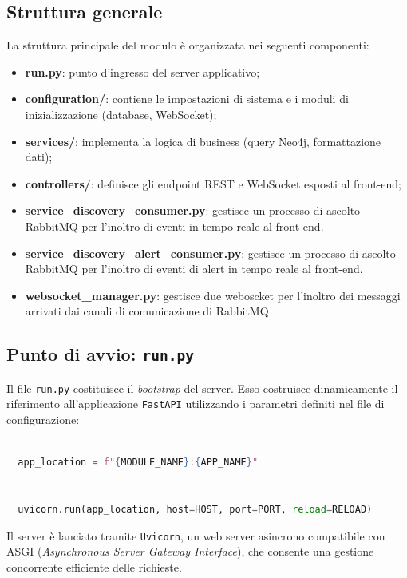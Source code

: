 \subsection{Struttura generale}
La struttura principale del modulo è organizzata nei seguenti componenti:
\begin{itemize}
  \item \textbf{run.py}: punto d’ingresso del server applicativo;
  \item \textbf{configuration/}: contiene le impostazioni di sistema e i moduli di inizializzazione (database, WebSocket);
  \item \textbf{services/}: implementa la logica di business (query Neo4j, formattazione dati);
  \item \textbf{controllers/}: definisce gli endpoint REST e WebSocket esposti al front-end;
  \item \textbf{service\_discovery\_consumer.py}: gestisce un processo di ascolto RabbitMQ per l’inoltro di eventi in tempo reale al front-end.
  \item \textbf{service\_discovery\_alert\_consumer.py}: gestisce un processo di ascolto RabbitMQ per l'inoltro di eventi di alert in tempo reale al front-end. 
  \item \textbf{websocket\_manager.py}: gestisce due weboscket per l'inoltro dei messaggi arrivati dai canali di comunicazione di RabbitMQ 
\end{itemize}

\subsection{Punto di avvio: \texttt{run.py}}
Il file \texttt{run.py} costituisce il \textit{bootstrap} del server.  
Esso costruisce dinamicamente il riferimento all’applicazione \texttt{FastAPI} utilizzando i parametri definiti nel file di configurazione:

\begin{lstlisting}[language=Python, caption={Setting up iniziale del server fastapi}]

  app_location = f"{MODULE_NAME}:{APP_NAME}"


  uvicorn.run(app_location, host=HOST, port=PORT, reload=RELOAD)

\end{lstlisting}

Il server è lanciato tramite \texttt{Uvicorn}, un web server asincrono compatibile con ASGI (\textit{Asynchronous Server Gateway Interface}), che consente una gestione concorrente efficiente delle richieste.

